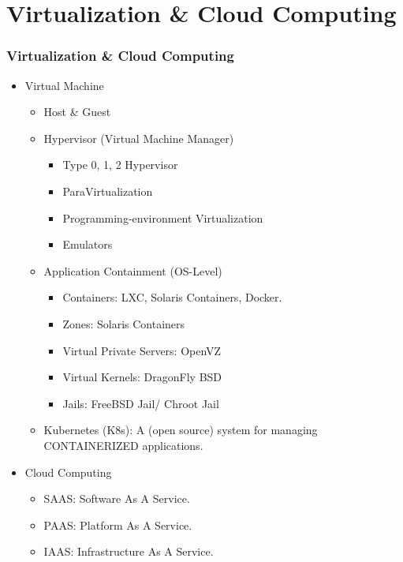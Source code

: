 \documentclass[aspectratio=169, xcolor=table, notheorems, hyperref={pdfpagelabels=false}]{beamer}
\begin{document}
\section{Virtualization \& Cloud Computing}
\begin{frame}
\frametitle{Virtualization \& Cloud Computing}
\begin{itemize}
\item Virtual Machine
\begin{itemize}
\item Host \& Guest
\item Hypervisor (Virtual Machine Manager)
\begin{itemize}
\item Type 0, 1, 2 Hypervisor
\item ParaVirtualization
\item Programming-environment Virtualization
\item Emulators
\end{itemize}
\item Application Containment (OS-Level)
\begin{itemize}
\item Containers: LXC, Solaris Containers, Docker.
\item Zones: Solaris Containers
\item Virtual Private Servers: OpenVZ
\item Virtual Kernels: DragonFly BSD
\item Jails: FreeBSD Jail/ Chroot Jail
\end{itemize}
\item Kubernetes (K8s): A (open source) system for managing CONTAINERIZED applications.
\end{itemize}
\item Cloud Computing
\begin{itemize}
\item SAAS: Software As A Service.
\item PAAS: Platform As A Service.
\item IAAS: Infrastructure As A Service.
\end{itemize}
\end{itemize}
\end{frame}

\end{document}
